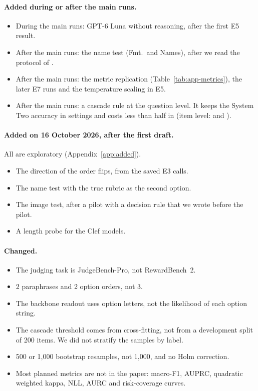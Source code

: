 \documentclass[11pt]{article}
\begin{document}
\paragraph{Added during or after the main runs.}
\begin{itemize}
\setlength\itemsep{0pt}
\item During the main runs: GPT-6 Luna without reasoning, after the first E5 result.
\item After the main runs: the name test (Fmt.\ and Names), after we read the protocol of \citet{rafe2026benchmarking}.
\item After the main runs: the metric replication (Table~\ref{tab:app-metrics}), the later E7 runs and the temperature scaling in E5.
\item After the main runs: a cascade rule at the question level. It keeps the System Two accuracy in \nCascadeKeptQ{} settings and costs less than half in \nCascadeCheapQ{} (item level: \nCascadeKept{} and \nCascadeKeptCheap).
\end{itemize}

\paragraph{Added on 16 October 2026, after the first draft.} All are exploratory (Appendix~\ref{app:added}).
\begin{itemize}
\setlength\itemsep{0pt}
\item The direction of the order flips, from the saved E3 calls.
\item The name test with the true rubric as the second option.
\item The image test, after a pilot with a decision rule that we wrote before the pilot.
\item A length probe for the Clef models.
\end{itemize}

\paragraph{Changed.}
\begin{itemize}
\setlength\itemsep{0pt}
\item The judging task is JudgeBench-Pro, not RewardBench~2.
\item 2 paraphrases and 2 option orders, not 3.
\item The backbone readout uses option letters, not the likelihood of each option string.
\item The cascade threshold comes from cross-fitting, not from a development split of 200 items. We did not stratify the samples by label.
\item 500 or 1,000 bootstrap resamples, not 1,000, and no Holm correction.
\item Most planned metrics are not in the paper: macro-F1, AUPRC, quadratic weighted kappa, NLL, AURC and risk-coverage curves.
\end{itemize}
\end{document}
